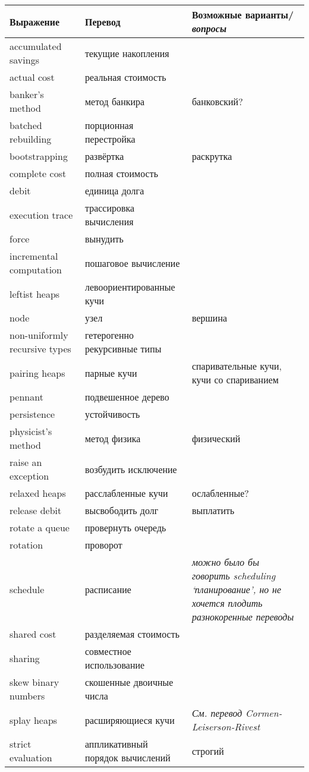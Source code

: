 \documentclass{article}
\begin{document}
\begin{tabular}{p{3cm}|p{4cm}|p{5cm}}
Выражение & Перевод & Возможные варианты/\textit{вопросы} \\
\hline
accumulated savings & текущие накопления \\
actual cost & реальная стоимость \\
banker's method & метод банкира & банковский? \\
batched rebuilding & порционная перестройка \\
bootstrapping & развёртка & раскрутка \\
complete cost & полная стоимость \\
debit & единица долга \\
execution trace & трассировка вычисления \\
force & вынудить \\
incremental computation & пошаговое вычисление \\
leftist heaps & левоориентированные кучи \\
node & узел & вершина \\
non-uniformly recursive types & гетерогенно рекурсивные типы \\
pairing heaps & парные кучи & спаривательные кучи, кучи со спариванием
\\
pennant & подвешенное дерево \\
persistence & устойчивость \\
physicist's method & метод физика & физический \\
raise an exception & возбудить исключение \\
relaxed heaps & расслабленные кучи & ослабленные? \\
release debit & высвободить долг & выплатить \\
rotate a queue & провернуть очередь \\
rotation & проворот \\
schedule & расписание & \textit{можно было бы говорить
  \emph{scheduling} `планирование', но не хочется плодить
  разнокоренные переводы} \\
shared cost & разделяемая стоимость \\
sharing & совместное использование \\
skew binary numbers & скошенные двоичные числа \\
splay heaps & расширяющиеся кучи & \textit{См. перевод Cormen-Leiserson-Rivest}\\
strict evaluation & аппликативный порядок вычислений & строгий \\

\end{tabular}
\end{document}
